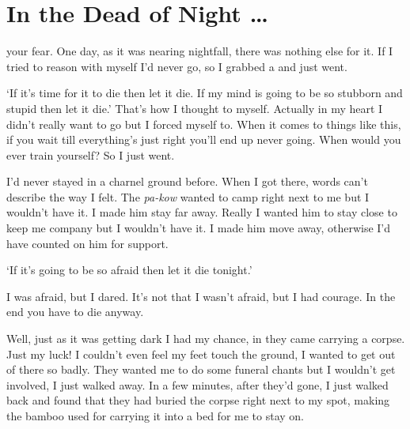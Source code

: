 
\chapter{In the Dead of Night \ldots}

 your fear. One day, as it was nearing nightfall, there was nothing else for it. If I tried to reason with myself I'd never go, so I grabbed a \textit{} and just went.

`If it's time for it to die then let it die. If my mind is going to be so stubborn and stupid then let it die.' That's how I thought to myself. Actually in my heart I didn't really want to go but I forced myself to. When it comes to things like this, if you wait till everything's just right you'll end up never going. When would you ever train yourself? So I just went.

I'd never stayed in a charnel ground before. When I got there, words can't describe the way I felt. The \textit{pa-kow} wanted to camp right next to me but I wouldn't have it. I made him stay far away. Really I wanted him to stay close to keep me company but I wouldn't have it. I made him move away, otherwise I'd have counted on him for support.

`If it's going to be so afraid then let it die tonight.'

I was afraid, but I dared. It's not that I wasn't afraid, but I had courage. In the end you have to die anyway.

Well, just as it was getting dark I had my chance, in they came carrying a corpse. Just my luck! I couldn't even feel my feet touch the ground, I wanted to get out of there so badly. They wanted me to do some funeral chants but I wouldn't get involved, I just walked away. In a few minutes, after they'd gone, I just walked back and found that they had buried the corpse right next to my spot, making the bamboo used for carrying it into a bed for me to stay on.

